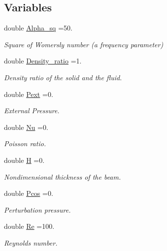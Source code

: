 \subsection*{Variables}
\begin{DoxyCompactItemize}
\item 
double \hyperlink{namespaceGlobal__Physical__Variables_a056817f9a80034eff75fcf94c44b08cd}{Alpha\+\_\+sq} =50.
\begin{DoxyCompactList}\small\item\em Square of Womersly number (a frequency parameter) \end{DoxyCompactList}\item 
double \hyperlink{namespaceGlobal__Physical__Variables_af5163137c5b98c6ebb942973cba4e297}{Density\+\_\+ratio} =1.
\begin{DoxyCompactList}\small\item\em Density ratio of the solid and the fluid. \end{DoxyCompactList}\item 
double \hyperlink{namespaceGlobal__Physical__Variables_a00f471db241ed712eaefcbaf4fb1d6a9}{Pext} =0.
\begin{DoxyCompactList}\small\item\em External Pressure. \end{DoxyCompactList}\item 
double \hyperlink{namespaceGlobal__Physical__Variables_a3962c36313826b19f216f6bbbdd6a477}{Nu} =0.
\begin{DoxyCompactList}\small\item\em Poisson ratio. \end{DoxyCompactList}\item 
double \hyperlink{namespaceGlobal__Physical__Variables_af6e07423e22c0991084d9a2f43727805}{H} =0.
\begin{DoxyCompactList}\small\item\em Nondimensional thickness of the beam. \end{DoxyCompactList}\item 
double \hyperlink{namespaceGlobal__Physical__Variables_ab55734aaa66260cd9d4bf68a4ecafdd5}{Pcos} =0.
\begin{DoxyCompactList}\small\item\em Perturbation pressure. \end{DoxyCompactList}\item 
double \hyperlink{namespaceGlobal__Physical__Variables_ab814e627d2eb5bc50318879d19ab16b9}{Re} =100.
\begin{DoxyCompactList}\small\item\em Reynolds number. \end{DoxyCompactList}\item 

\end{DoxyCompactItemize}
